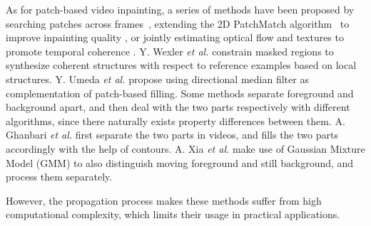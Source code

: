 As for patch-based video inpainting, a series of methods have been proposed by searching patches across frames~\cite{patwardhan2007video}, extending the 2D PatchMatch algorithm~\cite{barnes2009patchmatch} to improve inpainting quality \cite{newson2014video}, or jointly estimating optical flow and textures to promote temporal coherence \cite{huang2016temporally}.
Y. Wexler \emph{et al.} \cite{wexler2007space} constrain masked regions to synthesize coherent structures with respect to reference examples based on local structures. 
Y. Umeda \emph{et al.} \cite{umeda2012removal} propose using directional median filter as complementation of patch-based filling.
Some methods separate foreground and background apart, and then deal with the two parts respectively with different algorithms, since there naturally exists property differences between them.  
A. Ghanbari \emph{et al.} \cite{ghanbari2011contour} first separate the two parts in videos, and fills the two parts accordingly with the help of contours.
A. Xia \emph{et al.} \cite{xia2011exemplar} make use of Gaussian Mixture Model (GMM) to also distinguish moving foreground and still background, and process them separately.   
  
However, the propagation process makes these methods suffer from high computational complexity, which limits their usage in practical applications. 




